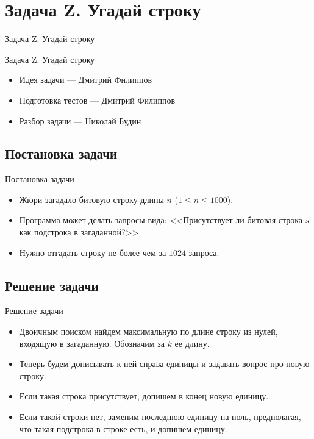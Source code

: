 \section{Задача Z. Угадай строку}

\begin{frame}[t]{Задача Z. Угадай строку}

  \begin{center}
    \LARGE Задача Z. Угадай строку
  \end{center}

  \begin{itemize}
    \item Идея задачи --- Дмитрий Филиппов
    \item Подготовка тестов --- Дмитрий Филиппов
    \item Разбор задачи --- Николай Будин
  \end{itemize}
\end{frame}

\subsection{Постановка задачи}

\begin{frame}[t]{Постановка задачи}
\begin{itemize}
    \item Жюри загадало битовую строку длины $n$ ($1 \le n \le 1000$).
    \item Программа может делать запросы вида: <<Присутствует ли битовая строка $s$ как подстрока в загаданной?>>
    \item Нужно отгадать строку не более чем за $1024$ запроса.
\end{itemize}
\end{frame}

\subsection{Решение задачи}

\begin{frame}[t]{Решение задачи}
\begin{itemize}
    \item Двоичным поиском найдем максимальную по длине строку из нулей, входящую в загаданную. Обозначим за $k$ ее длину.
    \item Теперь будем дописывать к ней справа единицы и задавать вопрос про новую строку.
    \item Если такая строка присутствует, допишем в конец новую единицу.
    \item Если такой строки нет, заменим последнюю единицу на ноль, предполагая, что такая подстрока в строке есть, и допишем единицу.
\end{itemize}
\end{frame}

